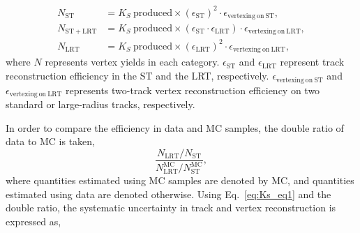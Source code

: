 \begin{align}
    N_{\mathrm{ST}}  &= K_{S}~\mathrm{produced} \times (\epsilon_{\mathrm{ST}})^{2} \cdot \epsilon_{\mathrm{vertexing~on~ST}}, \nonumber \\
    N_{\mathrm{ST+LRT}}  &= K_{S}~\mathrm{produced} \times (\epsilon_{\mathrm{ST}} \cdot \epsilon_{\mathrm{LRT}}) \cdot \epsilon_{\mathrm{vertexing~on~LRT}}, \nonumber \\
    N_{\mathrm{LRT}}&= K_{S}~\mathrm{produced} \times (\epsilon_{\mathrm{LRT}})^{2} \cdot \epsilon_{\mathrm{vertexing~on~LRT}},
\label{eq:Ks_eq1}
\end{align}
%
where $N$ represents vertex yields in each category. $\epsilon_{\mathrm{ST}}$ and $\epsilon_{\mathrm{LRT}}$ represent track reconstruction efficiency in the ST and the LRT, respectively. $\epsilon_{\mathrm{vertexing~on~ST}}$ and $\epsilon_{\mathrm{vertexing~on~LRT}}$ represents two-track vertex reconstruction efficiency on two standard or large-radius tracks, respectively.

In order to compare the efficiency in data and MC samples, the double ratio of data to MC is taken,
\begin{equation}
\dfrac{N_{\mathrm{LRT}} / N_{\mathrm{ST}}}{N_{\mathrm{LRT}}^{\mathrm{MC}} / N_{\mathrm{ST}}^{\mathrm{MC}}},
\label{eq:Ks_eq2}
\end{equation}
%
where quantities estimated using MC samples are denoted by MC, and quantities estimated using data are denoted otherwise. Using Eq.~\ref{eq:Ks_eq1} and the double ratio, the systematic uncertainty in track and vertex reconstruction is expressed as,


